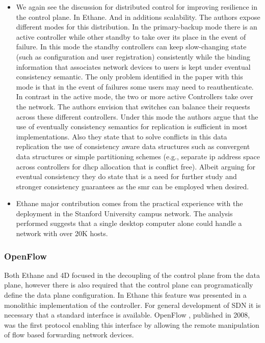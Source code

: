 \documentclass[12pt,openright,twoside]{report}
\begin{document}
\begin{itemize}
\begin{itemize}
\item We again see the discussion  for distributed control for improving resilience in the control plane.
In Ethane.
And in additions scalability.
The authors expose different modes for this distribution. In the primary-backup mode there is an active controller while other standby to take over its place in the event of failure. 
In this mode the standby controllers can keep slow-changing state (such as configuration and user registration) consistently while the binding information that associates network devices to users is kept under eventual consistency semantic. The only problem identified in the paper with this mode is that in the event of failures some users may need to reauthenticate. 
In contrast in the active mode, the two or more active Controllers take over the network. The authors envision that switches can balance their requests across these different controllers. Under this mode the authors argue that  the use of eventually consistency semantics for replication is sufficient in most implementations. Also they state that to solve conflicts in this data replication the use of consistency aware data structures such as convergent data structures or simple partitioning schemes (e.g., separate \gls{ip} address space across controllers for \gls{dhcp} allocation that is conflict free). Albeit arguing for eventual consistency they do state that is a need for further study and stronger consistency guarantees as the \gls{smr} can be employed when desired. 

\item Ethane major contribution comes from the practical  experience with
the deployment in the Stanford
University  campus network. The  analysis performed suggests that a single
desktop computer alone could handle a network with over 20K hosts. 

\end{itemize}


\subsubsection{OpenFlow}
Both Ethane \cite{Casado:2007kb} and 4D \cite{Greenberg:2005boa}
focused in the decoupling of the control plane from the data plane, however there is also required that the control plane can programatically define the data plane configuration. In Ethane this
feature was presented in a monolithic  implementation of the controller.
For general development of SDN  it is  necessary that a
standard interface is available. OpenFlow \cite{openflow}, published
in 2008,  was the first protocol enabling this interface by allowing
the remote manipulation of flow based forwarding network devices. 


\end{itemize}
\end{document}

